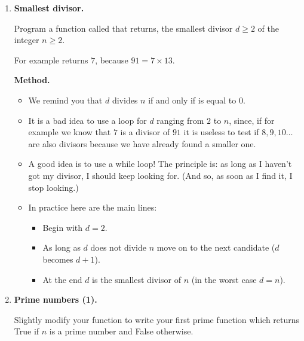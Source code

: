 \documentclass[11pt,class=report,crop=false]{standalone}
\begin{document}
\begin{activite}



\begin{enumerate}
  \item \textbf{Smallest divisor.}
  
  Program a function called  that returns, the smallest divisor $d\ge2$ of the integer $n\ge2$.
  
  For example  returns $7$, because $91 = 7 \times 13$.
  
  \medskip
  
  \textbf{Method.}
  \begin{itemize}
    \item We remind you that $d$ divides $n$ if and only if  is equal to $0$.
    \item It is a bad idea to use a loop \og{}for $d$ ranging from $2$ to $n$\fg{}, since, if for example we know that $7$ is a divisor of $91$ it is useless to test if $8,9,10\ldots$ are also divisors because we have already found a smaller one.
    
    \item A good idea is to use a \og{}while\fg{} loop!
    The principle is: \og{}as long as I haven't got my divisor, I should keep looking for\fg{}. (And so, as soon as I find it, I stop looking.)
    
    \item In practice here are the main lines:
    \begin{itemize}
      \item Begin with $d=2$.
      \item As long as $d$ does not divide $n$ move on to the next candidate ($d$ becomes $d+1$).
      \item At the end $d$ is the smallest divisor of $n$ (in the worst case $d=n$).
     \end{itemize} 
  \end{itemize}
  
  
  \item \textbf{Prime numbers (1).}
  
  Slightly modify your  function to write your first  prime function  which returns \og{}True\fg{} if $n$ is a prime number and \og{}False\fg{} otherwise.
  

\end{enumerate}
\end{activite}
\end{document}
